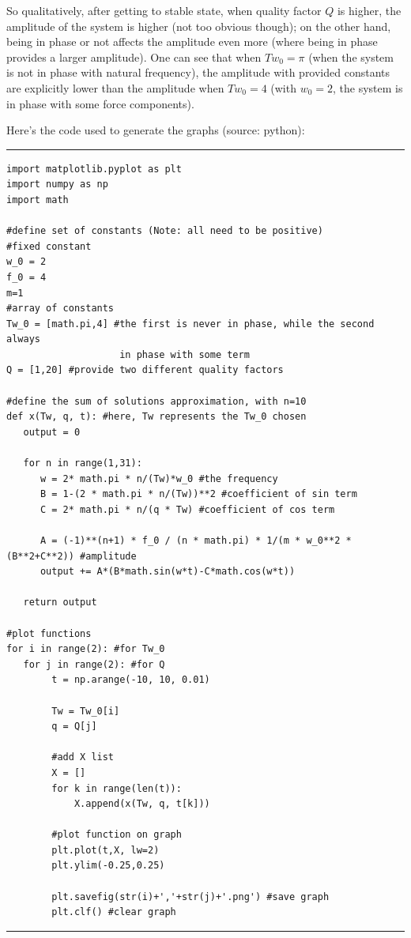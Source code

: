 \documentclass{article}
\begin{document}
So qualitatively, after getting to stable state, when quality factor $Q$ is higher, the amplitude of the system is higher (not too obvious though); on the other hand, being in phase or not affects the amplitude even more (where being in phase provides a larger amplitude). One can see that when $Tw_0 = \pi$ (when the system is not in phase with natural frequency), the amplitude with provided constants are explicitly lower than the amplitude when $Tw_0 = 4$ (with $w_0 = 2$, the system is in phase with some force components).

\hfil

Here's the code used to generate the graphs (source: python):

\rule{15.24cm}{0.01mm}

\begin{verbatim}
import matplotlib.pyplot as plt
import numpy as np
import math

#define set of constants (Note: all need to be positive)
#fixed constant
w_0 = 2 
f_0 = 4
m=1
#array of constants
Tw_0 = [math.pi,4] #the first is never in phase, while the second always 
                    in phase with some term
Q = [1,20] #provide two different quality factors

#define the sum of solutions approximation, with n=10
def x(Tw, q, t): #here, Tw represents the Tw_0 chosen
   output = 0

   for n in range(1,31):
      w = 2* math.pi * n/(Tw)*w_0 #the frequency
      B = 1-(2 * math.pi * n/(Tw))**2 #coefficient of sin term
      C = 2* math.pi * n/(q * Tw) #coefficient of cos term

      A = (-1)**(n+1) * f_0 / (n * math.pi) * 1/(m * w_0**2 * (B**2+C**2)) #amplitude
      output += A*(B*math.sin(w*t)-C*math.cos(w*t))

   return output

#plot functions
for i in range(2): #for Tw_0
   for j in range(2): #for Q
        t = np.arange(-10, 10, 0.01)

        Tw = Tw_0[i]
        q = Q[j]

        #add X list
        X = []
        for k in range(len(t)):
            X.append(x(Tw, q, t[k]))

        #plot function on graph
        plt.plot(t,X, lw=2)
        plt.ylim(-0.25,0.25)

        plt.savefig(str(i)+','+str(j)+'.png') #save graph
        plt.clf() #clear graph
\end{verbatim}

\rule{15.24cm}{0.01mm}
\end{document}
